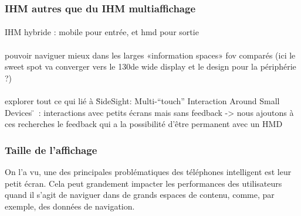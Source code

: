 

\subsubsection*{IHM autres que du IHM multiaffichage}
\paragraph*{}
IHM hybride : mobile pour entrée, et hmd pour sortie \cite{LeeBudhirajaBillinghurst2013}

\paragraph*{}
pouvoir naviguer mieux dans les larges «information spaces» fov comparés \cite{RaedleJetterMuellerEtAl2014} (ici le sweet spot va converger vers le 130\textdegree de wide display et le design pour la périphérie ?)

\paragraph*{}
explorer tout ce qui lié à \"SideSight: Multi-“touch” Interaction Around Small Devices \"~: interactions avec petits écrans mais sans feedback -> nous ajoutons à ces recherches le feedback qui a la possibilité d'être permanent avec un HMD


\subsubsection*{Taille de l'affichage}
On l'a vu, une des principales problématiques des téléphones intelligent est leur petit écran. Cela peut grandement impacter les performances des utilisateurs quand il s'agit de naviguer dans de grands espaces de contenu, comme, par exemple, des données de navigation.

